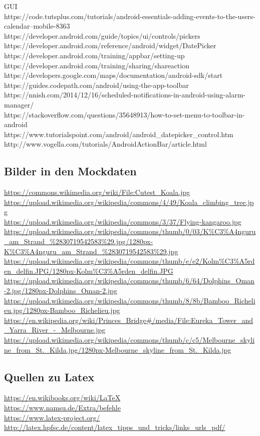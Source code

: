 GUI\\
https://code.tutsplus.com/tutorials/android-essentials-adding-events-to-the-users-calendar--mobile-8363\\
https://developer.android.com/guide/topics/ui/controls/pickers\\
https://developer.android.com/reference/android/widget/DatePicker\\
https://developer.android.com/training/appbar/setting-up\\
https://developer.android.com/training/sharing/shareaction\\
https://developers.google.com/maps/documentation/android-sdk/start\\
https://guides.codepath.com/android/using-the-app-toolbar\\
https://nnish.com/2014/12/16/scheduled-notifications-in-android-using-alarm-manager/\\
https://stackoverflow.com/questions/35648913/how-to-set-menu-to-toolbar-in-android\\
https://www.tutorialspoint.com/android/android\_datepicker\_control.htm\\
http://www.vogella.com/tutorials/AndroidActionBar/article.html\\

\subsection{Bilder in den Mockdaten}
\url{https://commons.wikimedia.org/wiki/File:Cutest_Koala.jpg}\\
\url{https://upload.wikimedia.org/wikipedia/commons/4/49/Koala_climbing_tree.jpg}\\
\url{https://upload.wikimedia.org/wikipedia/commons/3/37/Flying-kangaroo.jpg}\\
\url{https://upload.wikimedia.org/wikipedia/commons/thumb/0/03/K\%C3\%A4nguru_am_Strand_\%2830719542583\%29.jpg/1280px-K\%C3\%A4nguru_am_Strand_\%2830719542583\%29.jpg}\\
\url{https://upload.wikimedia.org/wikipedia/commons/thumb/e/e2/Kolm\%C3\%A5rden_delfin.JPG/1280px-Kolm\%C3\%A5rden_delfin.JPG}\\
\url{https://upload.wikimedia.org/wikipedia/commons/thumb/6/64/Dolphins_Oman-2.jpg/1280px-Dolphins_Oman-2.jpg}\\
\url{https://upload.wikimedia.org/wikipedia/commons/thumb/8/8b/Bamboo_Richelieu.jpg/1280px-Bamboo_Richelieu.jpg}\\
\url{https://en.wikipedia.org/wiki/Princes_Bridge#/media/File:Eureka_Tower_and_Yarra_River_-_Melbourne.jpg}\\
\url{https://upload.wikimedia.org/wikipedia/commons/thumb/c/c5/Melbourne_skyline_from_St._Kilda.jpg/1280px-Melbourne_skyline_from_St._Kilda.jpg}


\subsection{Quellen zu Latex}

\url{https://en.wikibooks.org/wiki/LaTeX}\\
\url{https://www.namsu.de/Extra/befehle}\\
\url{https://www.latex-project.org/}\\
\url{http://latex.hpfsc.de/content/latex_tipps_und_tricks/links_urls_pdf/}\\


